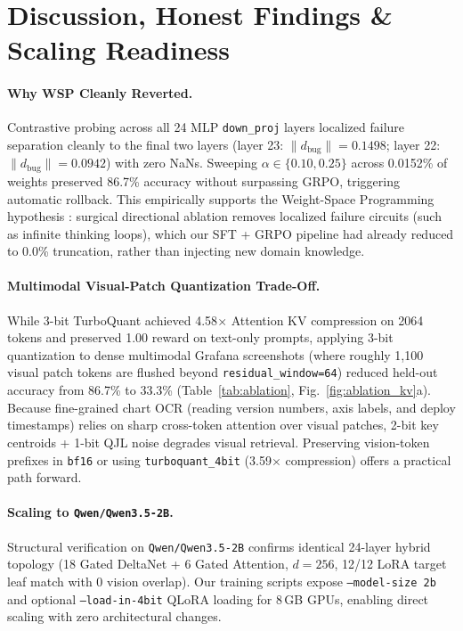 \documentclass[10pt,letterpaper]{article}
\begin{document}
\section{Discussion, Honest Findings \& Scaling Readiness}
\paragraph{Why WSP Cleanly Reverted.} Contrastive probing across all 24 MLP \texttt{down\_proj} layers localized failure separation cleanly to the final two layers (layer 23: $\|d_{\text{bug}}\|=0.1498$; layer 22: $\|d_{\text{bug}}\|=0.0942$) with zero NaNs. Sweeping $\alpha \in \{0.10, 0.25\}$ across 0.0152\% of weights preserved 86.7\% accuracy without surpassing GRPO, triggering automatic rollback. This empirically supports the Weight-Space Programming hypothesis \cite{wsp}: surgical directional ablation removes localized failure circuits (such as infinite thinking loops), which our SFT + GRPO pipeline had already reduced to 0.0\% truncation, rather than injecting new domain knowledge.

\paragraph{Multimodal Visual-Patch Quantization Trade-Off.} While 3-bit TurboQuant achieved 4.58$\times$ Attention KV compression on 2064 tokens and preserved 1.00 reward on text-only prompts, applying 3-bit quantization to dense multimodal Grafana screenshots (where roughly 1,100 visual patch tokens are flushed beyond \texttt{residual\_window=64}) reduced held-out accuracy from 86.7\% to 33.3\% (Table~\ref{tab:ablation}, Fig.~\ref{fig:ablation_kv}a). Because fine-grained chart OCR (reading version numbers, axis labels, and deploy timestamps) relies on sharp cross-token attention over visual patches, 2-bit key centroids + 1-bit QJL noise degrades visual retrieval. Preserving vision-token prefixes in \texttt{bf16} or using \texttt{turboquant\_4bit} (3.59$\times$ compression) offers a practical path forward.

\paragraph{Scaling to \texttt{Qwen/Qwen3.5-2B}.} Structural verification on \texttt{Qwen/Qwen3.5-2B} confirms identical 24-layer hybrid topology (18 Gated DeltaNet + 6 Gated Attention, $d=256$, 12/12 LoRA target leaf match with 0 vision overlap). Our training scripts expose \texttt{--model-size 2b} and optional \texttt{--load-in-4bit} QLoRA loading for 8\,GB GPUs, enabling direct scaling with zero architectural changes.
\end{document}
